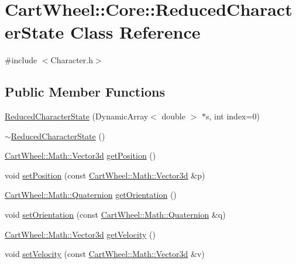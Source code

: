 \hypertarget{classCartWheel_1_1Core_1_1ReducedCharacterState}{
\section{CartWheel::Core::ReducedCharacterState Class Reference}
\label{classCartWheel_1_1Core_1_1ReducedCharacterState}
}


{\ttfamily \#include $<$Character.h$>$}

\subsection*{Public Member Functions}
\begin{DoxyCompactItemize}
\item 
\hyperlink{classCartWheel_1_1Core_1_1ReducedCharacterState_a6c252498e0bbab7da8c1fcfe4df3b84b}{ReducedCharacterState} (DynamicArray$<$ double $>$ $\ast$s, int index=0)
\item 
\hyperlink{classCartWheel_1_1Core_1_1ReducedCharacterState_ae99e3ea594b4b147c33572723944a59b}{$\sim$ReducedCharacterState} ()
\item 
\hyperlink{classCartWheel_1_1Math_1_1Vector3d}{CartWheel::Math::Vector3d} \hyperlink{classCartWheel_1_1Core_1_1ReducedCharacterState_aba9291acc70e54da9857d8e5b084c45a}{getPosition} ()
\item 
void \hyperlink{classCartWheel_1_1Core_1_1ReducedCharacterState_a613c33842feef1068f73dc49c6d61ac2}{setPosition} (const \hyperlink{classCartWheel_1_1Math_1_1Vector3d}{CartWheel::Math::Vector3d} \&p)
\item 
\hyperlink{classCartWheel_1_1Math_1_1Quaternion}{CartWheel::Math::Quaternion} \hyperlink{classCartWheel_1_1Core_1_1ReducedCharacterState_ab4a4505aa8f953f6bdd06cf06546e86f}{getOrientation} ()
\item 
void \hyperlink{classCartWheel_1_1Core_1_1ReducedCharacterState_a9af2d2e546fdc867ccc45b069e3f9722}{setOrientation} (const \hyperlink{classCartWheel_1_1Math_1_1Quaternion}{CartWheel::Math::Quaternion} \&q)
\item 
\hyperlink{classCartWheel_1_1Math_1_1Vector3d}{CartWheel::Math::Vector3d} \hyperlink{classCartWheel_1_1Core_1_1ReducedCharacterState_a5c97fe81fcdd12e1a5a62a23e6b81e35}{getVelocity} ()
\item 
void \hyperlink{classCartWheel_1_1Core_1_1ReducedCharacterState_af2cccddb47d48597d4107d5ef84e3396}{setVelocity} (const \hyperlink{classCartWheel_1_1Math_1_1Vector3d}{CartWheel::Math::Vector3d} \&v)

\end{DoxyCompactItemize}
